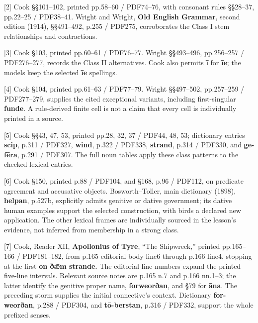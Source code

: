 [2] Cook §§101–102, printed pp.58–60 /\allowbreak{} PDF74–76, with consonant rules §§28–37, pp.22–25 /\allowbreak{} PDF38–41. Wright and Wright, \textbf{Old English Grammar}, second edition (1914), §§491–492, p.255 /\allowbreak{} PDF275, corroborates the Class I stem relationships and contractions.

[3] Cook §103, printed pp.60–61 /\allowbreak{} PDF76–77. Wright §§493–496, pp.256–257 /\allowbreak{} PDF276–277, records the Class II alternatives. Cook also permits \textbf{ī} for \textbf{īe}; the models keep the selected \textbf{īe} spellings.

[4] Cook §104, printed pp.61–63 /\allowbreak{} PDF77–79. Wright §§497–502, pp.257–259 /\allowbreak{} PDF277–279, supplies the cited exceptional variants, including first-singular \textbf{funde}. A rule-derived finite cell is not a claim that every cell is individually printed in a source.

[5] Cook §§43, 47, 53, printed pp.28, 32, 37 /\allowbreak{} PDF44, 48, 53; dictionary entries \textbf{scip}, p.311 /\allowbreak{} PDF327, \textbf{wind}, p.322 /\allowbreak{} PDF338, \textbf{strand}, p.314 /\allowbreak{} PDF330, and \textbf{ge-fēra}, p.291 /\allowbreak{} PDF307. The full noun tables apply these class patterns to the checked lexical entries.

[6] Cook §150, printed p.88 /\allowbreak{} PDF104, and §168, p.96 /\allowbreak{} PDF112, on predicate agreement and accusative objects. Bosworth–Toller, main dictionary (1898), \textbf{helpan}, p.527b, explicitly admits genitive or dative government; its dative human examples support the selected construction, with birds a declared new application. The other lexical frames are individually sourced in the lesson's evidence, not inferred from membership in a strong class.

[7] Cook, Reader XII, \textbf{Apollonius of Tyre}, “The Shipwreck,” printed pp.165–166 /\allowbreak{} PDF181–182, from p.165 editorial body line6 through p.166 line4, stopping at the first \textbf{on ðǣm strande.} The editorial line numbers expand the printed five-line intervals. Relevant source notes are p.165 n.7 and p.166 nn.1–3; the latter identify the genitive proper name, \textbf{forweorðan}, and §79 for \textbf{āna}. The preceding storm supplies the initial connective's context. Dictionary \textbf{for-weorðan}, p.288 /\allowbreak{} PDF304, and \textbf{tō-berstan}, p.316 /\allowbreak{} PDF332, support the whole prefixed senses.

